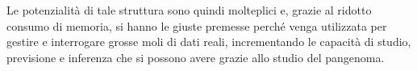 \documentclass[a4paper,11pt, oneside,italian]{article}
\begin{document}
Le potenzialità di tale struttura sono quindi molteplici e, grazie al ridotto
consumo di memoria, si hanno le giuste premesse perché venga utilizzata per
gestire e interrogare grosse moli di dati reali, incrementando le capacità di
studio, previsione e inferenza che si possono avere grazie allo studio del
pangenoma.
\end{document}
